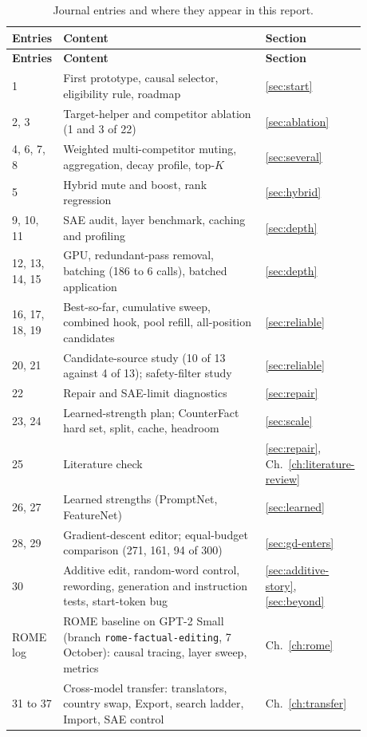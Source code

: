 \setcounter{table}{0}
{\small
\begin{longtable}{|p{0.11\linewidth}|p{0.60\linewidth}|p{0.17\linewidth}|}
\caption{Journal entries and where they appear in this report.}\label{tab:journal}\\ \hline
\textbf{Entries} & \textbf{Content} & \textbf{Section}\\ \hline \endfirsthead
\hline \textbf{Entries} & \textbf{Content} & \textbf{Section}\\ \hline \endhead
1 & First prototype, causal selector, eligibility rule, roadmap & \ref{sec:start}\\ \hline
2, 3 & Target-helper and competitor ablation (1 and 3 of 22) & \ref{sec:ablation}\\ \hline
4, 6, 7, 8 & Weighted multi-competitor muting, aggregation, decay profile, top-$K$ & \ref{sec:several}\\ \hline
5 & Hybrid mute and boost, rank regression & \ref{sec:hybrid}\\ \hline
9, 10, 11 & SAE audit, layer benchmark, caching and profiling & \ref{sec:depth}\\ \hline
12, 13, 14, 15 & GPU, redundant-pass removal, batching (186 to 6 calls), batched application & \ref{sec:depth}\\ \hline
16, 17, 18, 19 & Best-so-far, cumulative sweep, combined hook, pool refill, all-position candidates & \ref{sec:reliable}\\ \hline
20, 21 & Candidate-source study (10 of 13 against 4 of 13); safety-filter study & \ref{sec:reliable}\\ \hline
22 & Repair and SAE-limit diagnostics & \ref{sec:repair}\\ \hline
23, 24 & Learned-strength plan; CounterFact hard set, split, cache, headroom & \ref{sec:scale}\\ \hline
25 & Literature check & \ref{sec:repair}, Ch.~\ref{ch:literature-review}\\ \hline
26, 27 & Learned strengths (PromptNet, FeatureNet) & \ref{sec:learned}\\ \hline
28, 29 & Gradient-descent editor; equal-budget comparison (271, 161, 94 of 300) & \ref{sec:gd-enters}\\ \hline
30 & Additive edit, random-word control, rewording, generation and instruction tests, start-token bug & \ref{sec:additive-story}, \ref{sec:beyond}\\ \hline
ROME log & ROME baseline on GPT-2 Small (branch \texttt{rome-factual-editing}, 7 October): causal tracing, layer sweep, metrics & Ch.~\ref{ch:rome}\\ \hline
31 to 37 & Cross-model transfer: translators, country swap, Export, search ladder, Import, SAE control & Ch.~\ref{ch:transfer}\\ \hline
\end{longtable}
}

